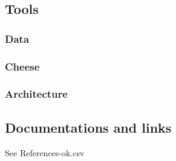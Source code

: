 \documentclass[8pt]{article} %
\begin{document}

%




\subsection{Tools}

{\footnotesize
\subsubsection{Data}

%
\subsubsection{Cheese}

\subsubsection{Architecture}
}

\subsection{Documentations and links}
See References-ok.csv
\end{document}
